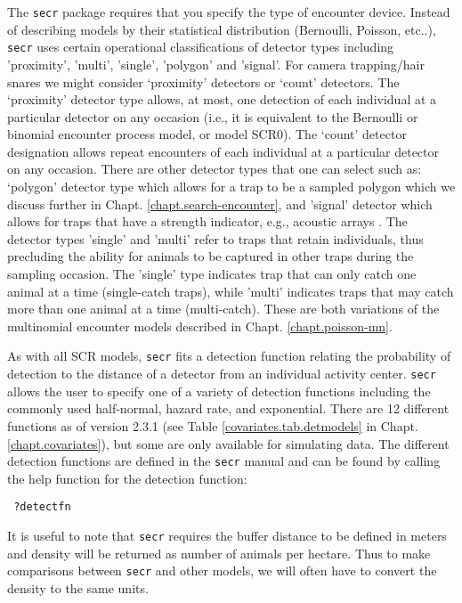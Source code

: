 The \mbox{\tt secr} package requires that you specify the type of
encounter device.  Instead of describing models by their statistical
distribution (Bernoulli, Poisson, etc..), \mbox{\tt secr} uses certain
operational classifications of detector types including 'proximity',
'multi', 'single', 'polygon' and 'signal'.  For camera trapping/hair
snares we might consider `proximity' detectors or `count' detectors.
The `proximity' detector type allows, at most, one detection of each
individual at a particular detector on any occasion (i.e., it is
equivalent to the Bernoulli or binomial encounter process model, or
model SCR0).  The `count' detector designation allows repeat
encounters of each individual at a particular detector on any
occasion.  There are other detector types that one can select such as:
`polygon' detector type which allows for a trap to be a sampled
polygon \citep{royle_young:2008} which we discuss further in
Chapt. \ref{chapt.search-encounter}, and 'signal' detector which
allows for traps that have a strength indicator, e.g., acoustic arrays
\citep{dawson_efford:2009}.
The detector types 'single' and 'multi' 
refer to traps that retain individuals, thus precluding the ability
for animals to be captured in other traps during the sampling
occasion.  The 'single' type indicates trap that can only catch one
animal at a time (single-catch traps), while 'multi' indicates traps that may catch more
than one animal at a time (multi-catch). These are both variations of
the multinomial encounter models described in
Chapt. \ref{chapt.poisson-mn}.

As with all SCR models, \mbox{\tt secr} fits a detection function relating
the probability of detection to the distance of a detector from an
individual activity center. \mbox{\tt secr} allows the user to specify one of a
variety of detection functions including the commonly used
half-normal, hazard rate, and exponential.  There are 12 different
functions as of version 2.3.1 (see Table \ref{covariates.tab.detmodels} in Chapt. \ref{chapt.covariates}), but
some are only available for simulating data.
The different detection functions are defined in
the \mbox{\tt secr} manual and can be found by calling the help function for the
detection function:
\begin{verbatim}
 ?detectfn
\end{verbatim}
It is useful to note that \mbox{\tt secr} requires the buffer distance to be
defined in meters and density will be returned as number of animals
per hectare.  Thus to make comparisons between \mbox{\tt secr} and other models,
we will often have to convert the density to the same units.

